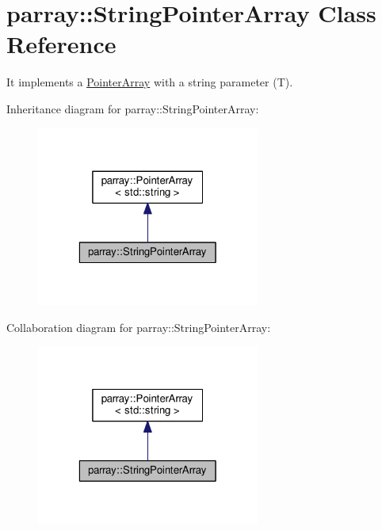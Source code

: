 \hypertarget{classparray_1_1StringPointerArray}{\section{parray\-:\-:String\-Pointer\-Array Class Reference}
\label{classparray_1_1StringPointerArray}
}


It implements a \hyperlink{classparray_1_1PointerArray_ab506b284822d1e013813579e06893797}{Pointer\-Array} with a string parameter (T).  




Inheritance diagram for parray\-:\-:String\-Pointer\-Array\-:\nopagebreak
\begin{figure}[H]
\begin{center}
\leavevmode
\includegraphics[width=208pt]{classparray_1_1StringPointerArray__inherit__graph}
\end{center}
\end{figure}


Collaboration diagram for parray\-:\-:String\-Pointer\-Array\-:\nopagebreak
\begin{figure}[H]
\begin{center}
\leavevmode
\includegraphics[width=208pt]{classparray_1_1StringPointerArray__coll__graph}
\end{center}
\end{figure}
